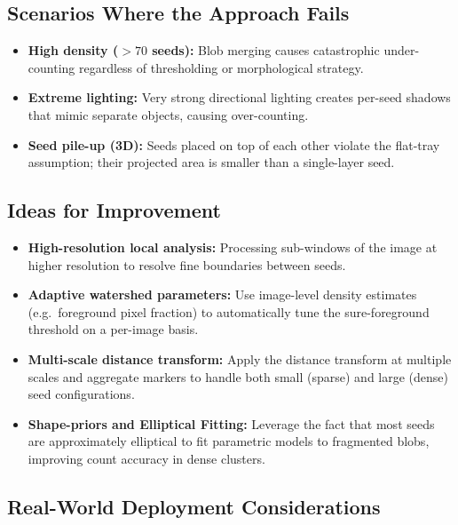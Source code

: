 \documentclass[12pt,a4paper]{article}
\begin{document}
\subsection{Scenarios Where the Approach Fails}

\begin{itemize}
    \item \textbf{High density ($>70$ seeds):} Blob merging causes catastrophic
          under-counting regardless of thresholding or morphological strategy.
    \item \textbf{Extreme lighting:} Very strong directional lighting creates
          per-seed shadows that mimic separate objects, causing over-counting.
    \item \textbf{Seed pile-up (3D):} Seeds placed on top of each other violate
          the flat-tray assumption; their projected area is smaller than a
          single-layer seed.
\end{itemize}

\subsection{Ideas for Improvement}

\begin{itemize}
    \item \textbf{High-resolution local analysis:} Processing sub-windows of the
          image at higher resolution to resolve fine boundaries between seeds.
    \item \textbf{Adaptive watershed parameters:} Use image-level density
          estimates (e.g.\ foreground pixel fraction) to automatically tune
          the sure-foreground threshold on a per-image basis.
    \item \textbf{Multi-scale distance transform:} Apply the distance
          transform at multiple scales and aggregate markers to handle both
          small (sparse) and large (dense) seed configurations.
    \item \textbf{Shape-priors and Elliptical Fitting:} Leverage the fact that
          most seeds are approximately elliptical to fit parametric models to
          fragmented blobs, improving count accuracy in dense clusters.
\end{itemize}

\subsection{Real-World Deployment Considerations}
\end{document}
